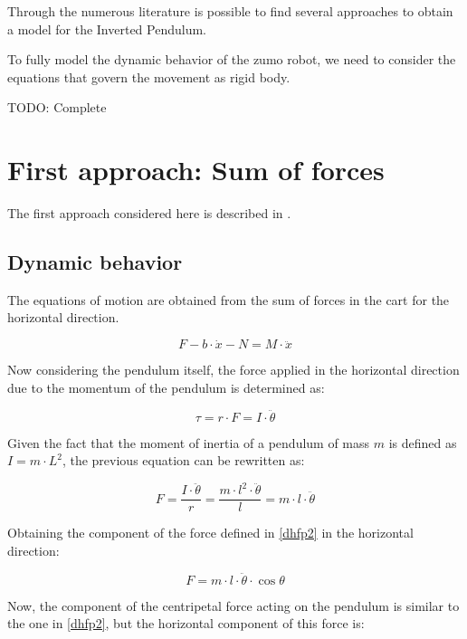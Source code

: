 Through the numerous literature is possible to find several approaches to obtain a model for the Inverted Pendulum.

To fully model the dynamic behavior of the zumo robot, we need to consider the equations that govern the movement as rigid body.

TODO: Complete

\section{First approach: Sum of forces}

The first approach considered here is described in \cite{SUL03}.

\subsection{Dynamic behavior}

The equations of motion are obtained from the sum of forces in the cart for the horizontal direction.

\begin{equation} \label{sfch}
	F-b\cdot \dot{x}-N=M\cdot \ddot{x}
\end{equation}

Now considering the pendulum itself, the force applied in the horizontal direction due to the momentum of the pendulum is determined as:

\begin{equation} \label{dhfp}
	\tau=r\cdot F=I\cdot \ddot{\theta}
\end{equation}

Given the fact that the moment of inertia of a pendulum of mass $m$ is defined as $I=m\cdot L^2$, the previous equation can be rewritten as:

\begin{equation} \label{dhfp2}
	F=\frac{I\cdot \ddot{\theta}}{r}=\frac{m\cdot l^2\cdot \ddot{\theta}}{l}=m\cdot l\cdot \ddot{\theta}
\end{equation}

Obtaining the component of the force defined in \ref{dhfp2} in the horizontal direction:

\begin{equation} \label{sfph}
	F=m\cdot l\cdot \ddot{\theta}\cdot \cos{\theta}
\end{equation}

Now, the component of the centripetal force acting on the pendulum is similar to the one in \ref{dhfp2}, but the horizontal component of this force is:

